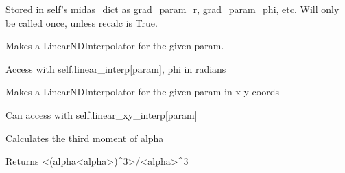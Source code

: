 \documentclass[letterpaper,10pt,english]{sphinxmanual}
\begin{document}
\begin{fulllineitems}
\begin{fulllineitems}
\sphinxAtStartPar
Stored in self’s midas\_dict as grad\_param\_r, grad\_param\_phi, etc.
Will only be called once, unless recalc is True.

\end{fulllineitems}


\begin{fulllineitems}
\label{\detokenize{api/MARIGOLD.Condition:MARIGOLD.Condition.calc_linear_interp}}
\pysigstartsignatures
{}
\pysigstopsignatures
\sphinxAtStartPar
Makes a LinearNDInterpolator for the given param.

\sphinxAtStartPar
Access with self.linear\_interp{[}param{]}, phi in radians

\end{fulllineitems}


\begin{fulllineitems}
\label{\detokenize{api/MARIGOLD.Condition:MARIGOLD.Condition.calc_linear_xy_interp}}
\pysigstartsignatures
{}
\pysigstopsignatures
\sphinxAtStartPar
Makes a LinearNDInterpolator for the given param in x y coords

\sphinxAtStartPar
Can access  with self.linear\_xy\_interp{[}param{]}

\end{fulllineitems}


\begin{fulllineitems}
\label{\detokenize{api/MARIGOLD.Condition:MARIGOLD.Condition.calc_mu3_alpha}}
\pysigstartsignatures
{}
\pysigstopsignatures
\sphinxAtStartPar
Calculates the third moment of alpha

\sphinxAtStartPar
Returns \textless{}(alpha\sphinxhyphen{}\textless{}alpha\textgreater{})\textasciicircum{}3\textgreater{}/\textless{}alpha\textgreater{}\textasciicircum{}3


\end{fulllineitems}
\end{fulllineitems}
\end{document}
